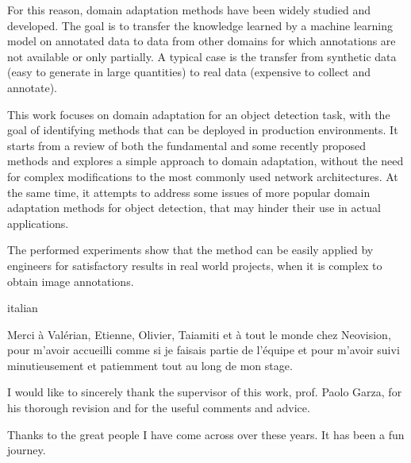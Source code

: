\documentclass[%
    corpo=12pt,
    twoside,
    stile=classica,   
    tipotesi=magistrale,
    evenboxes,
    english,
	numerazioneromana,
]{toptesi}
\begin{document}
For this reason, domain adaptation methods have been widely studied and developed. The goal is to transfer the knowledge learned by a machine learning model on annotated data to data from other domains for which annotations are not available or only partially. A typical case is the transfer from synthetic data (easy to generate in large quantities) to real data (expensive to collect and annotate).

\bigskip
This work focuses on domain adaptation for an object detection task, with the goal of identifying methods that can be deployed in production environments. It starts from a review of both the fundamental and some recently proposed methods and explores a simple approach to domain adaptation, without the need for complex modifications to the most commonly used network architectures. At the same time, it attempts to address some issues of more popular domain adaptation methods for object detection, that may hinder their use in actual applications.

The performed experiments show that the method can be easily applied by engineers for satisfactory results in real world projects, when it is complex to obtain image annotations.

\paginavuota %

\ringraziamenti
\begin{otherlanguage*}{italian}
\end{otherlanguage*}

\vspace*{1cm}

\bigskip
\foreignlanguage{french}{Merci à Valérian, Etienne, Olivier, Taiamiti et à tout le monde chez Neovision, pour m'avoir accueilli comme si je faisais partie de l'équipe et pour m'avoir suivi minutieusement et patiemment tout au long de mon stage.}

\bigskip
I would like to sincerely thank the supervisor of this work, prof. Paolo Garza, for his thorough revision and for the useful comments and advice.

\bigskip
Thanks to the great people I have come across over these years. It has been a fun journey.

\newpage
\end{document}
